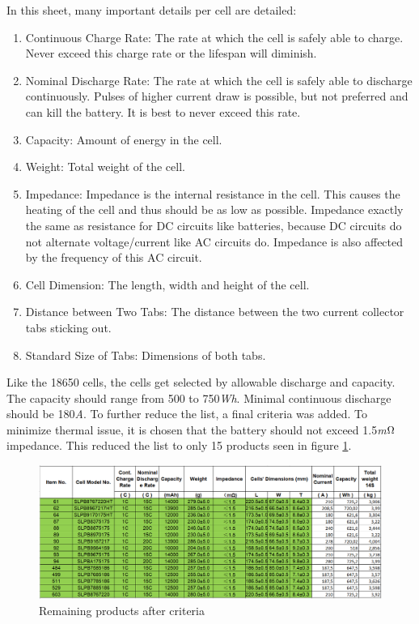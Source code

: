 In this sheet, many important details per cell are detailed:
\begin{enumerate}
\item Continuous Charge Rate: The rate at which the cell is safely able to charge. Never exceed this charge rate or the lifespan will diminish.
\item Nominal Discharge Rate: The rate at which the cell is safely able to discharge continuously. Pulses of higher current draw is possible, but not preferred and can kill the battery. It is best to never exceed this rate.
\item Capacity: Amount of energy in the cell.
\item Weight: Total weight of the cell.
\item Impedance: Impedance is the internal resistance in the cell. This causes the heating of the cell and thus should be as low as possible.
Impedance exactly the same as resistance for DC circuits like batteries, because DC circuits do not alternate voltage/current like AC circuits do. Impedance is also affected by the frequency of this AC circuit.
\item Cell Dimension: The length, width and height of the cell.
\item Distance between Two Tabs: The distance between the two current collector tabs sticking out.
\item Standard Size of Tabs: Dimensions of both tabs.
\end{enumerate}
Like the 18650 cells, the cells get selected by allowable discharge and capacity. The capacity should range from 500 to 750\textit{Wh}. Minimal continuous discharge should be 180\textit{A}. To further reduce the list, a final criteria was added. To minimize thermal issue, it is chosen that the battery should not exceed 1.5\textit{m$\ohm$} impedance. This reduced the list to only 15 products seen in figure \ref{Fig:melasta_productlist2}.

\begin{figure} [H]
	\centering
	\includegraphics[width=1\linewidth]{Figures/melasta_datasheet2.PNG}
	\caption{Remaining products after criteria}
   \label{Fig:melasta_productlist2}
\end{figure}

